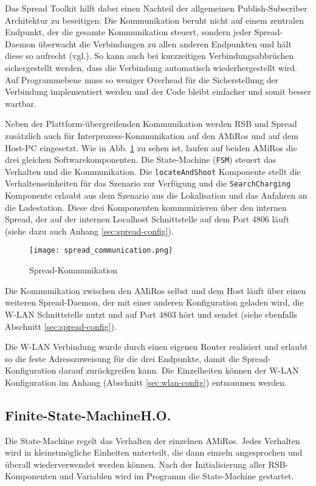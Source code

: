 Das Spread Toolkit hilft dabei einen Nachteil der allgemeinen Publish-Subscriber Architektur zu beseitigen: Die Kommunikation beruht nicht auf einem zentralen Endpunkt, der die gesamte Kommunikation steuert, sondern jeder Spread-Daemon überwacht die Verbindungen zu allen anderen Endpunkten und hält diese so aufrecht (vgl.\cite{Siciliano:2007}). So kann auch bei kurzzeitigen Verbindungsabbrüchen sichergestellt werden, dass die Verbindung automatisch wiederhergestellt wird. Auf Programmebene  muss so weniger Overhead für die Sicherstellung der Verbindung implementiert werden und der Code bleibt einfacher und somit besser wartbar.

Neben der Plattform-übergreifenden Kommunikation werden RSB und Spread zusätzlich auch für Interprozess-Kommunikation auf den AMiRos und auf dem Host-PC eingesetzt. Wie in Abb. \ref{fig:spread} zu sehen ist, laufen auf beiden AMiRos die drei gleichen Softwarekomponenten. Die State-Machine (\texttt{FSM}) steuert das Verhalten und die Kommunikation. Die \texttt{locateAndShoot} Komponente stellt die Verhaltenseinheiten für das Szenario zur Verfügung und die \texttt{SearchCharging} Komponente erlaubt aus dem Szenario aus die Lokalisation und das Anfahren an die Ladestation. Diese drei Komponenten kommunizieren über den internen Spread, der auf der internen Localhost Schnittstelle auf dem Port 4806 läuft (siehe dazu auch Anhang \ref{sec:spread-config}).

\begin{figure}[h]
	\begin{center}
		\texttt{[image: spread\_communication.png]} 
		\caption{Spread-Kommunikation}
		\label{fig:spread}
	\end{center}
\end{figure}

Die Kommunikation zwischen den AMiRos selbst und dem Host läuft über einen weiteren Spread-Daemon, der mit einer anderen Konfiguration geladen wird, die W-LAN Schnittstelle nutzt und auf Port  4803 hört und sendet (siehe ebenfalls Abschnitt \ref{sec:spread-config}).

Die W-LAN Verbindung wurde durch einen eigenen Router realisiert und erlaubt so die feste Adresszuweisung für die drei Endpunkte, damit die Spread-Konfiguration darauf zurückgreifen kann. Die Einzelheiten können der W-LAN Konfiguration im Anhang (Abschnitt \ref{sec:wlan-config}) entnommen werden.

\subsection[Finite-State-Machine]{Finite-State-Machine\hfill {\normalsize H.O.}} \label{cha:Finite-State-Machine}
Die State-Machine regelt das Verhalten der einzelnen AMiRos. Jedes Verhalten wird in kleinstmögliche Einheiten unterteilt, die dann einzeln angesprochen und überall wiederverwendet werden können. Nach der Initialisierung aller RSB-Komponenten und Variablen wird im Programm die State-Machine gestartet.

